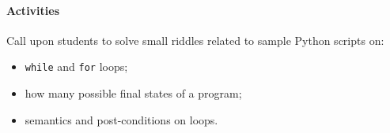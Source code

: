 				\paragraph*{Activities}
					Call upon students to solve small riddles related to sample Python scripts on:

					\begin{itemize}
						\item \texttt{while} and \texttt{for} loops;
						\item how many possible final states of a program;
						\item semantics and post-conditions on loops.
					\end{itemize}
